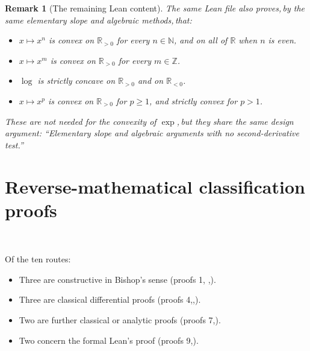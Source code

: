 \documentclass[11pt,reqno]{amsart}
\makeatletter
\providecommand{\R}{\mathbb{R}}
\providecommand{\N}{\mathbb{N}}
\theoremstyle{redplain}
\newtheorem{remark}{Remark}[section]
\providecommand{\Z}{\mathbb{Z}}
\providecommand{\comma}{,\,}
\renewenvironment{quotation}
{\list{}{\listparindent\z@
		\itemindent\z@
		\rightmargin\leftmargin
		\parsep\z@}	\item\relax}
{\endlist}
\numberwithin{equation}{section}
\makeatother
\begin{document}
\begin{remark}[The remaining Lean content]
The same Lean file also proves\comma by the same elementary slope and
algebraic methods\comma that:

\begin{itemize}
\item $x\mapsto x^{n}$ is convex on $\R_{>0}$ for every $n\in \N$, and on
all of $\R$ when $n$ is even.

\item $x\mapsto x^{m}$ is convex on $\R_{>0}$ for every $m\in \Z$.

\item $\log $ is strictly concave on $\R_{>0}$ and on $\R_{<0}$.

\item $x\mapsto x^{p}$ is convex on $\R_{>0}$ for $p\geq 1$, and strictly
convex for $p>1$.
\end{itemize}

\noindent These are not needed for the convexity of $\exp $\comma but they
share the same design argument: \textquotedblleft Elementary slope and
algebraic arguments with no second-derivative test.\textquotedblright
\end{remark}

\section{Reverse-mathematical classification proofs}

\label{sec:summary}

{\  }

\begin{quotation}
\noindent Of the ten routes:\thinspace
\end{quotation}

\begin{itemize}
\item Three are constructive in Bishop's sense (proofs 1,\thinspace
{},\thinspace {}).

\item \allowbreak Three are classical differential proofs (proofs
4,\thinspace {},\thinspace {}).

\item \thinspace \allowbreak Two are further classical or analytic proofs
(proofs 7,\thinspace {}).

\item Two concern the formal Lean's proof (proofs 9,\thinspace {}).
\end{itemize}
\end{document}

